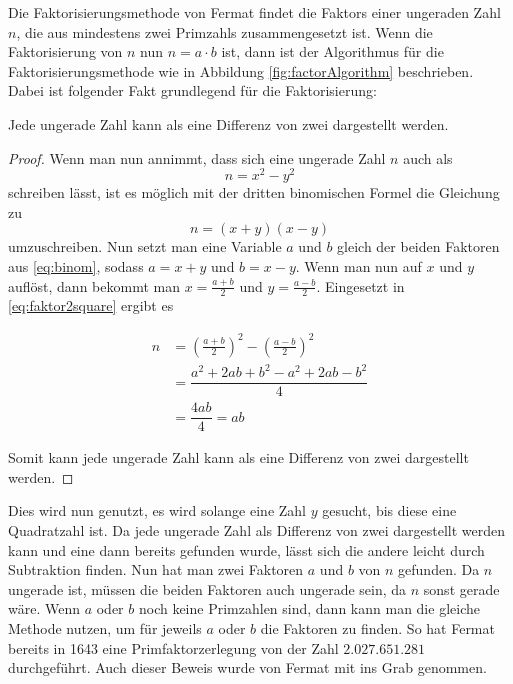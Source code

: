 Die Faktorisierungsmethode von Fermat findet die \Glspl{Faktor} einer  ungeraden Zahl $n$, die aus mindestens zwei \Glspl{Primzahl} zusammengesetzt ist. Wenn die Faktorisierung von $n$ nun $n = a \cdot b$ ist, dann ist der Algorithmus für die Faktorisierungsmethode wie in Abbildung \ref{fig:factorAlgorithm} beschrieben. Dabei ist folgender Fakt grundlegend für die Faktorisierung:

\begin{theorem}
    Jede ungerade Zahl kann als eine Differenz von zwei  dargestellt werden.
\end{theorem}
\begin{proof}
    Wenn man nun annimmt, dass sich eine ungerade Zahl $n$ auch als \begin{equation} \label{eq:faktor2square}
        n = x^2 - y^2
    \end{equation}
    schreiben lässt, ist es möglich mit der dritten binomischen Formel die Gleichung zu
    \begin{equation} \label{eq:binom}
        n = (x+y)(x-y)
    \end{equation}
    umzuschreiben. Nun setzt man eine Variable $a$ und $b$ gleich der beiden Faktoren aus \eqref{eq:binom}, sodass $a = x + y$ und $b = x - y$. Wenn man nun auf $x$ und $y$ auflöst, dann bekommt man $x = \frac{a+b}{2}$ und $y = \frac{a-b}{2}$. Eingesetzt in \eqref{eq:faktor2square} ergibt es

    \begin{align*}
        n & = \left( \frac{a+b}{2} \right)^2 - \left( \frac{a-b}{2} \right)^2 \\
          & = \dfrac{a^2 + 2ab + b^2 - a^2 + 2ab - b^2}{4}                    \\
          & = \dfrac{4ab}{4} = ab
    \end{align*}

    Somit kann jede ungerade Zahl kann als eine Differenz von zwei  dargestellt werden.

\end{proof}

Dies wird nun genutzt, es wird solange eine Zahl $y$ gesucht, bis diese eine \Gls{Quadratzahl} ist. Da jede ungerade Zahl als Differenz von zwei  dargestellt werden kann und eine dann bereits gefunden wurde, lässt sich die andere leicht durch Subtraktion finden. Nun hat man zwei Faktoren $a$ und $b$ von $n$ gefunden. Da $n$ ungerade ist, müssen die beiden Faktoren auch ungerade sein, da $n$ sonst gerade wäre. Wenn $a$ oder $b$ noch keine Primzahlen sind, dann kann man die gleiche Methode nutzen, um für jeweils $a$ oder $b$ die Faktoren zu finden. So hat Fermat bereits in 1643 eine Primfaktorzerlegung von der Zahl $2.027.651.281$ durchgeführt. Auch dieser Beweis wurde von Fermat mit ins Grab genommen.

